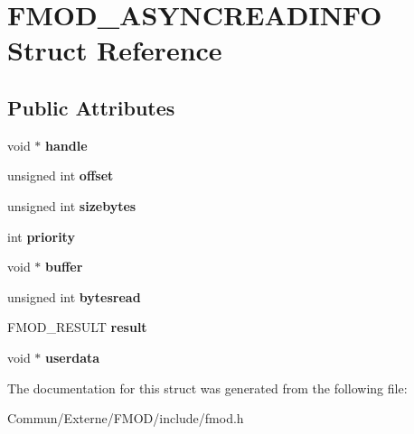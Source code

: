 \hypertarget{struct_f_m_o_d___a_s_y_n_c_r_e_a_d_i_n_f_o}{}\section{F\+M\+O\+D\+\_\+\+A\+S\+Y\+N\+C\+R\+E\+A\+D\+I\+N\+FO Struct Reference}
\label{struct_f_m_o_d___a_s_y_n_c_r_e_a_d_i_n_f_o}
\subsection*{Public Attributes}
\begin{DoxyCompactItemize}
\item 
void $\ast$ {\bfseries handle}\hypertarget{struct_f_m_o_d___a_s_y_n_c_r_e_a_d_i_n_f_o_a31e2e01864e3c97844a252f947ff8040}{}\label{struct_f_m_o_d___a_s_y_n_c_r_e_a_d_i_n_f_o_a31e2e01864e3c97844a252f947ff8040}

\item 
unsigned int {\bfseries offset}\hypertarget{struct_f_m_o_d___a_s_y_n_c_r_e_a_d_i_n_f_o_a8d42cc77cd8ef0559a666038e02a8807}{}\label{struct_f_m_o_d___a_s_y_n_c_r_e_a_d_i_n_f_o_a8d42cc77cd8ef0559a666038e02a8807}

\item 
unsigned int {\bfseries sizebytes}\hypertarget{struct_f_m_o_d___a_s_y_n_c_r_e_a_d_i_n_f_o_a19cda62a563d8b9c3116411c13d207f6}{}\label{struct_f_m_o_d___a_s_y_n_c_r_e_a_d_i_n_f_o_a19cda62a563d8b9c3116411c13d207f6}

\item 
int {\bfseries priority}\hypertarget{struct_f_m_o_d___a_s_y_n_c_r_e_a_d_i_n_f_o_aae5a4b76307bec7a0132b3abb04ab823}{}\label{struct_f_m_o_d___a_s_y_n_c_r_e_a_d_i_n_f_o_aae5a4b76307bec7a0132b3abb04ab823}

\item 
void $\ast$ {\bfseries buffer}\hypertarget{struct_f_m_o_d___a_s_y_n_c_r_e_a_d_i_n_f_o_a2154c0c4825d5f133e0b14ca1b94b324}{}\label{struct_f_m_o_d___a_s_y_n_c_r_e_a_d_i_n_f_o_a2154c0c4825d5f133e0b14ca1b94b324}

\item 
unsigned int {\bfseries bytesread}\hypertarget{struct_f_m_o_d___a_s_y_n_c_r_e_a_d_i_n_f_o_acef1543320ee49d5c723ce1dbd58e43b}{}\label{struct_f_m_o_d___a_s_y_n_c_r_e_a_d_i_n_f_o_acef1543320ee49d5c723ce1dbd58e43b}

\item 
F\+M\+O\+D\+\_\+\+R\+E\+S\+U\+LT {\bfseries result}\hypertarget{struct_f_m_o_d___a_s_y_n_c_r_e_a_d_i_n_f_o_a85e0137ab5748fbbd7ffee359823f57e}{}\label{struct_f_m_o_d___a_s_y_n_c_r_e_a_d_i_n_f_o_a85e0137ab5748fbbd7ffee359823f57e}

\item 
void $\ast$ {\bfseries userdata}\hypertarget{struct_f_m_o_d___a_s_y_n_c_r_e_a_d_i_n_f_o_a8a273751e70e26c1a51540a18269eecc}{}\label{struct_f_m_o_d___a_s_y_n_c_r_e_a_d_i_n_f_o_a8a273751e70e26c1a51540a18269eecc}

\end{DoxyCompactItemize}


The documentation for this struct was generated from the following file\+:\begin{DoxyCompactItemize}
\item 
Commun/\+Externe/\+F\+M\+O\+D/include/fmod.\+h\end{DoxyCompactItemize}
